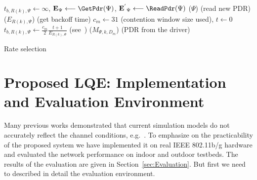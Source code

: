\documentclass[11pt,draftclsnofoot,journal,onecolumn]{IEEEtran}
\begin{document}
\begin{algorithm}
$t_{b,R(k),\Psi}\longleftarrow\infty$,
$\mathbf{E}_{\Psi}\longleftarrow \GetPdr(\Psi)$,
$\mathbf{E^{'}}_{\Psi}\longleftarrow \ReadPdr(\Psi)$\;
\Procedure \GetPdr($\Psi$) (read new PDR)\;
\Procedure \GetBot($E_{R(k),\Psi}$) (get backoff time)\;
$c_m\longleftarrow 31$ (contention window size used),
$t\longleftarrow 0$\;
$t_{b,R(k),\Psi}\longleftarrow\frac{c_m}{2}\frac{t+1}{E_{R(k),\Psi}}$ (see~\cite[Eq. 17]{Draves_MobiCom_2004})\;
\Procedure \ReadPdr($M_{\Psi,k,D_m}$) (PDR from the driver)\;
\caption{Rate selection}
\label{alg:1}
\end{algorithm}

\section{Proposed LQE: Implementation and Evaluation Environment}
\label{sec:Implementation}

Many previous works demonstrated that current simulation models do not accurately reflect the channel conditions, e.g.~\cite{Newport_Simulation_2007,Lei_ieeewc_2009}. To emphasize on the practicability of the proposed system we have implemented it on real IEEE 802.11b/g hardware and evaluated the network performance on indoor and outdoor testbeds. The results of the evaluation are given in Section~\ref{sec:Evaluation}. But first we need to described in detail the evaluation environment.
\end{document}
